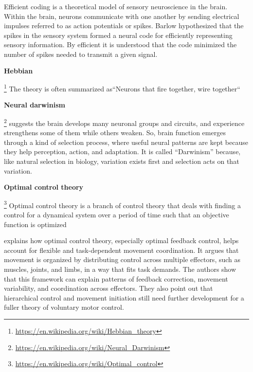 \documentclass{book}
\providecommand{\ProjectDeepHeading}[2]{%
    \par\medskip\noindent\textbf{#2}\par\smallskip
}
\providecommand{\clickurlfooter}[1]{\footnote{\url{#1}}}
\begin{document}
Efficient coding\cite{barlow-1961-possible-principles-underlying-the-transformation-of-sensory-messages} is a theoretical model of sensory neuroscience in the brain. Within the brain, neurons communicate with one another by sending electrical impulses referred to as action potentials or spikes. Barlow hypothesized that the spikes in the sensory system formed a neural code for efficiently representing sensory information. By efficient it is understood that the code minimized the number of spikes needed to transmit a given signal.

\ProjectDeepHeading{6}{Hebbian}


\clickurlfooter{https://en.wikipedia.org/wiki/Hebbian_theory} The theory is often summarized as``Neurons that fire together, wire together``

\ProjectDeepHeading{6}{Neural darwinism}


\clickurlfooter{https://en.wikipedia.org/wiki/Neural_Darwinism} suggests the brain develops many neuronal groups and circuits, and experience strengthens some of them while others weaken.
    So, brain function emerges through a kind of selection process, where useful neural patterns are kept because they help perception, action, and adaptation. It is called “Darwinism” because, like natural selection in biology, variation exists first and selection acts on that variation.

\ProjectDeepHeading{6}{Optimal control theory}


\clickurlfooter{https://en.wikipedia.org/wiki/Optimal_control} Optimal control theory is a branch of control theory that deals with finding a control for a dynamical system over a period of time such that an objective function is optimized
    
    \cite{diedrichsen-2009-the-coordination-of-movement-optimal-feedback-control-and-beyond} explains how optimal control theory, especially optimal feedback control, helps account for flexible and task-dependent movement coordination. It argues that movement is organized by distributing control across multiple effectors, such as muscles, joints, and limbs, in a way that fits task demands.
    The authors show that this framework can explain patterns of feedback correction, movement variability, and coordination across effectors. They also point out that hierarchical control and movement initiation still need further development for a fuller theory of voluntary motor control.
\end{document}
